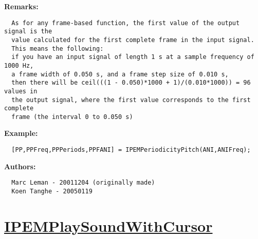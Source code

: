 \textbf{Remarks:}
\begin{verbatim}  As for any frame-based function, the first value of the output signal is the
  value calculated for the first complete frame in the input signal.
  This means the following:
  if you have an input signal of length 1 s at a sample frequency of 1000 Hz,
  a frame width of 0.050 s, and a frame step size of 0.010 s,
  then there will be ceil(((1 - 0.050)*1000 + 1)/(0.010*1000)) = 96 values in
  the output signal, where the first value corresponds to the first complete
  frame (the interval 0 to 0.050 s)

\end{verbatim}
\textbf{Example:}
\begin{verbatim}  [PP,PPFreq,PPPeriods,PPFANI] = IPEMPeriodicityPitch(ANI,ANIFreq);

\end{verbatim}
\textbf{Authors:}
\begin{verbatim}  Marc Leman - 20011204 (originally made)
  Koen Tanghe - 20050119
\end{verbatim}


\newpage
\section*{\hyperlink{Concepts:IPEMPlaySoundWithCursor}{IPEMPlaySoundWithCursor}}
\hypertarget{FuncRef:IPEMPlaySoundWithCursor}{}

